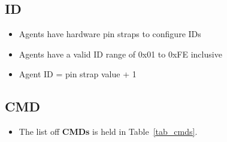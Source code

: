 \documentclass[a4paper]{article}
\begin{document}
   \subsection{ID}
      \begin{itemize}
         \item Agents have hardware pin straps to configure IDs
         \item Agents have a valid ID range of 0x01 to 0xFE inclusive
         \item Agent ID = pin strap value + 1
      \end{itemize}
  
   \subsection{CMD}
      \begin{itemize}
         \item The list off \textbf{CMDs} is held in Table~\ref{tab_cmds}. 
      \end{itemize}
 
\end{document}
